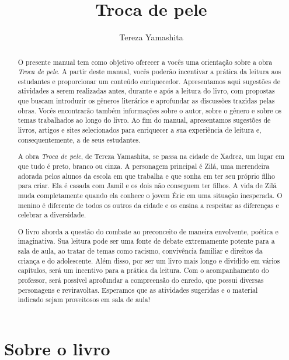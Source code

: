 \documentclass[11pt]{extarticle}
\newcommand{\AutorLivro}{Tereza Yamashita}
\newcommand{\TituloLivro}{Troca de pele}
\newcommand{\colaborador}{Ana Lancman}
\begin{document}
\title{\TituloLivro}
\author{\AutorLivro}
\def\authornotes{\colaborador}

\date{}
\maketitle

\tableofcontents


\begin{abstract}


O presente manual tem como objetivo oferecer a vocês uma orientação sobre a obra \textit{Troca de pele}. A partir deste manual, vocês poderão incentivar a prática da leitura aos estudantes e proporcionar um conteúdo enriquecedor. Apresentamos aqui sugestões de atividades a serem realizadas antes, durante e após a leitura do livro, com propostas que buscam introduzir os gêneros literários e aprofundar as discussões trazidas pelas obras. Vocês encontrarão também informações sobre o autor, sobre o gênero e sobre os temas trabalhados ao longo do livro. Ao fim do manual, apresentamos sugestões de livros, artigos e sites selecionados para enriquecer a sua experiência de leitura e, consequentemente, a de seus estudantes.

A obra \textit{Troca de pele}, de Tereza Yamashita, se passa na cidade de Xadrez, um lugar em que tudo é preto, branco ou cinza. A personagem principal é Zilá, uma merendeira adorada pelos alunos da escola em que trabalha e que sonha em ter seu próprio filho para criar. Ela é casada com Jamil e os dois não conseguem ter filhos. A vida de Zilá muda completamente quando ela conhece o jovem Éric em uma situação inesperada. O menino é diferente de todos os outros da cidade e os ensina a respeitar as diferenças e celebrar a diversidade.

O livro aborda a questão do combate ao preconceito de maneira envolvente, poética e imaginativa. Sua leitura pode ser uma fonte de debate extremamente potente para a sala de aula, ao tratar de temas como racismo, convivência familiar e direitos da criança e do adolescente. Além disso, por ser um livro mais longo e dividido em vários capítulos, será um incentivo para a prática da leitura. Com o acompanhamento do professor, será possível aprofundar a compreensão do enredo, que possui diversas personagens e reviravoltas. Esperamos que as atividades sugeridas e o material indicado sejam proveitosos em sala de aula! 

\end{abstract}

\section{Sobre o livro} 
\end{document}
